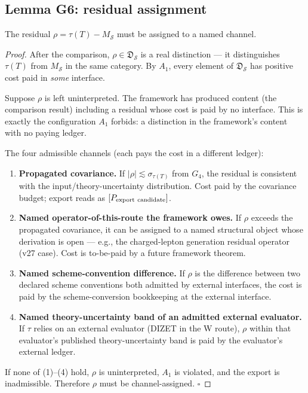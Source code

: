 \subsection{Lemma G6: residual assignment}
\label{subsec:lemma-G6}

\begin{lemma}
\label{lem:G6}
The residual $\rho = \tau(T) - M_{\mathcal{S}}$ must be assigned to a named channel.
\end{lemma}

\begin{proof}
After the comparison, $\rho \in \mathfrak{D}_{\mathcal{S}}$ is a real distinction --- it distinguishes $\tau(T)$ from $M_{\mathcal{S}}$ in the same category. By $A_1$, every element of $\mathfrak{D}_{\mathcal{S}}$ has positive cost paid in \emph{some} interface.

Suppose $\rho$ is left uninterpreted. The framework has produced content (the comparison result) including a residual whose cost is paid by no interface. This is exactly the configuration $A_1$ forbids: a distinction in the framework's content with no paying ledger.

The four admissible channels (each pays the cost in a different ledger):
\begin{enumerate}
\item \textbf{Propagated covariance.} If $|\rho| \lesssim \sigma_{\tau(T)}$ from $G_4$, the residual is consistent with the input/theory-uncertainty distribution. Cost paid by the covariance budget; export reads as $[P_{\rm export\ candidate}]$.
\item \textbf{Named operator-of-this-route the framework owes.} If $\rho$ exceeds the propagated covariance, it can be assigned to a named structural object whose derivation is open --- e.g., the charged-lepton generation residual operator (v27 case). Cost is to-be-paid by a future framework theorem.
\item \textbf{Named scheme-convention difference.} If $\rho$ is the difference between two declared scheme conventions both admitted by external interfaces, the cost is paid by the scheme-conversion bookkeeping at the external interface.
\item \textbf{Named theory-uncertainty band of an admitted external evaluator.} If $\tau$ relies on an external evaluator (DIZET in the W route), $\rho$ within that evaluator's published theory-uncertainty band is paid by the evaluator's external ledger.
\end{enumerate}

If none of (1)--(4) hold, $\rho$ is uninterpreted, $A_1$ is violated, and the export is inadmissible. Therefore $\rho$ must be channel-assigned. $\square$
\end{proof}

